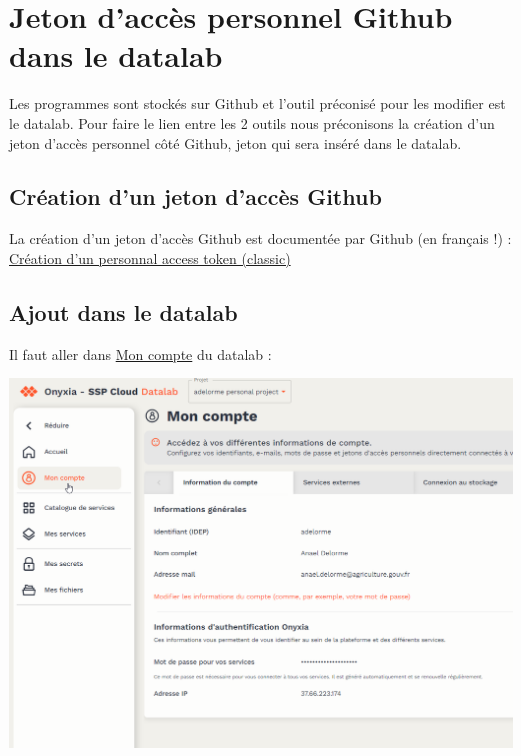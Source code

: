 \documentclass[
  letterpaper,
  DIV=11,
  numbers=noendperiod]{scrreprt}
\begin{document}
\hypertarget{jeton-daccuxe8s-personnel-github-dans-le-datalab}{%
\section{Jeton d'accès personnel Github dans le
datalab}\label{jeton-daccuxe8s-personnel-github-dans-le-datalab}}

Les programmes sont stockés sur Github et l'outil préconisé pour les
modifier est le datalab. Pour faire le lien entre les 2 outils nous
préconisons la création d'un jeton d'accès personnel côté Github, jeton
qui sera inséré dans le datalab.

\hypertarget{cruxe9ation-dun-jeton-daccuxe8s-github}{%
\subsection{Création d'un jeton d'accès
Github}\label{cruxe9ation-dun-jeton-daccuxe8s-github}}

La création d'un jeton d'accès Github est documentée par Github (en
français !) :
\href{https://docs.github.com/fr/authentication/keeping-your-account-and-data-secure/managing-your-personal-access-tokens\#cr\%C3\%A9ation-dun-personal-access-token-classic}{Création
d'un personnal access token (classic)}

\hypertarget{ajout-dans-le-datalab}{%
\subsection{Ajout dans le datalab}\label{ajout-dans-le-datalab}}

Il faut aller dans \href{https://datalab.sspcloud.fr/account}{Mon
compte} du datalab :

\includegraphics{./images/datalab_mon_compte.png}
\end{document}
